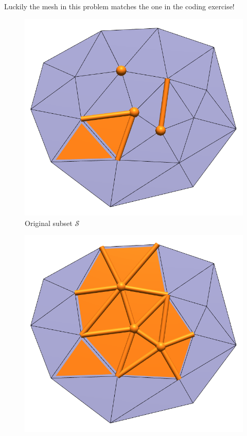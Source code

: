 \documentclass{article}
\begin{document}
\vspace{1.8cm}
\\\\

Luckily the mesh in this problem matches the one in the coding exercise!\\


\begin{table}[ht]
    \begin{subfigure}{0.45\columnwidth}
    \includegraphics[width=\linewidth]{figs/2_8_orig.png}
    \caption{Original subset $\mathcal{S}$}
    \end{subfigure}\hfill
    \begin{subfigure}{0.45\columnwidth}
    \includegraphics[width=\linewidth]{figs/2_8_star.png}   

\end{subfigure}
\end{table}
\end{document}
